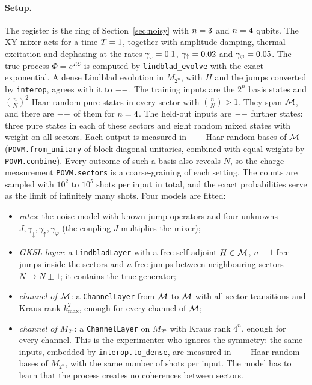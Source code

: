\paragraph{Setup.} The register is the ring of Section~\ref{sec:noisy} with $n=3$ and $n=4$ qubits. The
XY mixer acts for a time $T=1$, together with amplitude damping, thermal excitation and dephasing at the rates
$\gamma_\downarrow=0.1$, $\gamma_\uparrow=0.02$ and $\gamma_\varphi=0.05$. The true process
$\Phi=e^{T\mathcal L}$ is computed by \texttt{lindblad\_evolve} with the exact exponential. A dense Lindblad evolution in
$M_{2^n}$, with $H$ and the jumps converted by \texttt{interop}, agrees with it to $--$. The training
inputs are the $2^n$ basis states and $\binom nN^2$ Haar-random pure states in every sector with $\binom nN>1$. They
span $\mathcal{M}$, and
there are $--$ of them for $n=4$. The held-out inputs are $--$ further states: three pure states in each
of these sectors and eight random mixed states with weight on all sectors. Each output is measured in $--$
Haar-random bases of $\mathcal{M}$ (\texttt{POVM.from\_unitary} of block-diagonal unitaries, combined with equal weights by
\texttt{POVM.combine}). Every outcome of such a basis also reveals $N$, so the charge measurement
\texttt{POVM.sectors} is a coarse-graining of each setting. The counts are sampled with $10^2$ to $10^5$ shots per
input in total, and the exact probabilities serve as the limit of infinitely many shots. Four models are fitted:
\begin{itemize}
\item[(i)] \emph{rates}: the noise model with known jump operators and four unknowns $J,\gamma_\downarrow,
\gamma_\uparrow,\gamma_\varphi$ (the coupling $J$ multiplies the mixer);
\item[(ii)] \emph{GKSL layer}: a \texttt{LindbladLayer} with a free self-adjoint $H\in\mathcal{M}$, $n-1$ free jumps inside the
sectors and $n$ free jumps between neighbouring sectors $N\to N\pm1$; it contains the true generator;
\item[(iii)] \emph{channel of $\mathcal{M}$}: a \texttt{ChannelLayer} from $\mathcal{M}$ to $\mathcal{M}$ with all sector transitions and Kraus
rank $k_{\max}^2$, enough for every channel of $\mathcal{M}$;
\item[(iv)] \emph{channel of $M_{2^n}$}: a \texttt{ChannelLayer} on $M_{2^n}$ with Kraus rank $4^n$, enough for every
channel. This is the experimenter who ignores the symmetry: the same inputs, embedded by \texttt{interop.to\_dense},
are measured in $--$ Haar-random bases of $M_{2^n}$, with the same number of shots per input. The model
has to learn that the process creates no coherences between sectors.
\end{itemize}
